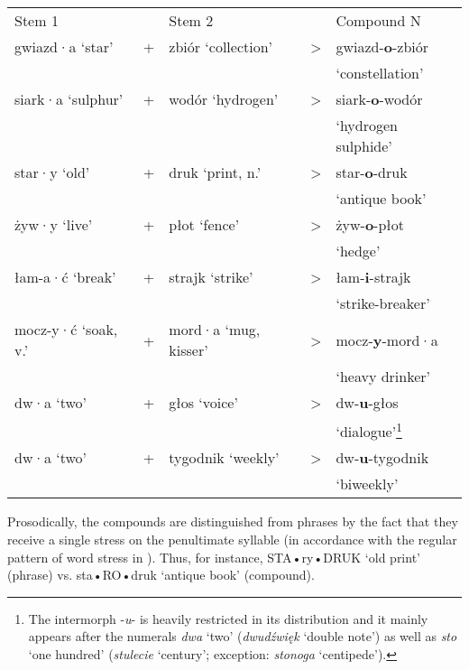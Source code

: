 \documentclass[output=paper]{LSP/langsci}
\begin{document}
\ea\label{ex:szymanek:2} 
\begin{tabularx}{\linewidth}[t]{lllll}
Stem 1    &&    Stem 2  &&       Compound N\\
{gwiazd}·a ‘star’ & +    &  zbiór ‘collection’  &> &gwiazd-{\textbf{o}}-zbiór\\ &&&&‘constellation’\\
{siark}·a ‘sulphur’ & + & wodór ‘hydrogen’ & >& siark-{\textbf{o}}-wodór \\
&&&&‘hydrogen sulphide’\\
{star}·y ‘old’   & + & druk ‘print, n.’   & > &star-{\textbf{o}}-druk \\
&&&&‘antique book’\\
{żyw}·y ‘live’  &  + & płot ‘fence’   & >& żyw-{\textbf{o}}-płot \\
&&&&‘hedge’\\
{łam-a}·ć ‘break’  &  + & strajk ‘strike’   & > & łam-{\textbf{i}}-strajk \\
&&&&‘strike-breaker’\\
{mocz-y}·ć ‘soak, v.’ & + & mord·a ‘mug, kisser’ & >& mocz-{\textbf{y}}{-mord}·a\\
&&&& ‘heavy drinker’\\
{dw}·a ‘two’   & + & głos ‘voice’   & >& dw-{\textbf{u}}-głos\\ &&&&‘dialogue’\footnote{{The intermorph -}{\textit{u}}{- is heavily restricted in its distribution and it mainly appears after the numerals} {\textit{dwa}} {‘two’ (}{\textit{dwudźwięk}} {‘double note’) as well as} {\textit{sto}} {‘one hundred’ (}{\textit{stulecie}} {‘century’; exception:} {\textit{stonoga}} {‘centipede’).}}\\
{dw}·a ‘two’   & + & tygodnik ‘weekly’ & > &dw-{\textbf{u}}-tygodnik \\
&&&&‘biweekly’\\
\end{tabularx}
\z 

Prosodically, the compounds are distinguished from phrases by the fact that they receive a single stress on the penultimate syllable (in accordance with the regular pattern of word stress in ). Thus, for instance, STA•ry•DRUK ‘old print’ (phrase) vs. sta•RO•druk ‘antique book’ (compound).
\end{document}
